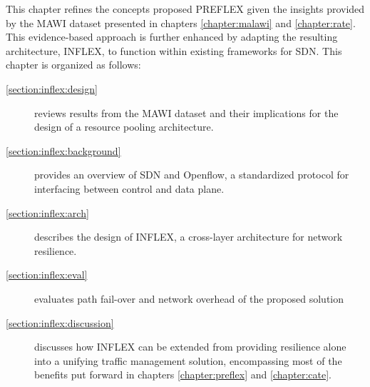 This chapter refines the concepts proposed \ac{PREFLEX} given the insights provided by the \ac{MAWI} dataset presented in chapters \ref{chapter:malawi} and \ref{chapter:rate}.
This evidence-based approach is further enhanced by adapting the resulting architecture, INFLEX, to function within existing frameworks for \ac{SDN}.
This chapter is organized as follows:

\renewcommand{\descriptionlabel}[1]{\hspace{\labelsep}\textbf{Section #1}}
\begin{description}
\item[\ref{section:inflex:design}] reviews results from the \ac{MAWI} dataset and their implications for the design of a resource pooling architecture.
\item[\ref{section:inflex:background}] provides an overview of \ac{SDN} and Openflow, a standardized protocol for interfacing between control and data plane.
\item[\ref{section:inflex:arch}] describes the design of INFLEX, a cross-layer architecture for network resilience.
\item[\ref{section:inflex:eval}] evaluates path fail-over and network overhead of the proposed solution
\item[\ref{section:inflex:discussion}] discusses how INFLEX can be extended from providing resilience alone into a unifying traffic management solution, encompassing most of the benefits put forward in chapters \ref{chapter:preflex} and \ref{chapter:cate}.
\end{description}


%


